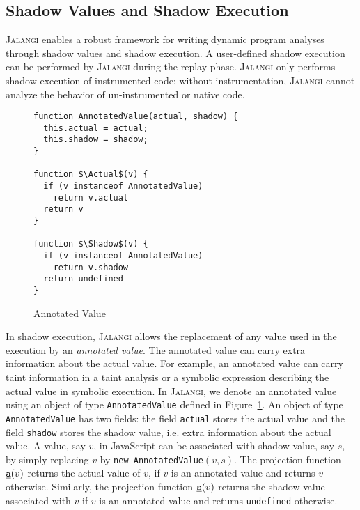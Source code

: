 \documentclass{sig-alternate}
\def\jalangi{\textsc{Jalangi}}
\newcommand \usl [1] {\mbox{\underline{\tt #1}}\xspace}
\newcommand \Actual{\usl{a}}
\newcommand \Shadow{\usl{s}}
\begin{document}
\subsection{Shadow Values and Shadow Execution}
\label{sec:shadow-values-shadow}

\jalangi{} enables a robust framework for writing dynamic program analyses
through shadow values and shadow execution.  A user-defined shadow
execution can be performed by \jalangi{} during the replay phase.
\jalangi{} only performs shadow execution of instrumented code:
without instrumentation, \jalangi{} cannot analyze the behavior of
un-instrumented or native code.

\lstset{language=JavaScript}
\begin{figure}
  
{\small 
\begin{lstlisting}[mathescape]
function AnnotatedValue(actual, shadow) {
  this.actual = actual;
  this.shadow = shadow;
}

function $\Actual$(v) {
  if (v instanceof AnnotatedValue)
    return v.actual
  return v
}

function $\Shadow$(v) {
  if (v instanceof AnnotatedValue)
    return v.shadow
  return undefined
}
\end{lstlisting}
}
  \caption{Annotated Value}
  \label{fig:annot}
\end{figure}

In shadow execution, \jalangi{} allows the replacement of any value
used in the execution by an \emph{annotated value}.  The annotated
value can carry extra information about the actual value.  For
example, an annotated value can carry taint information in a taint
analysis or a symbolic expression describing the actual value in
symbolic execution.  In \jalangi{}, we denote an annotated value using
an object of type \texttt{AnnotatedValue} defined in
Figure~\ref{fig:annot}.  An object of type \texttt{AnnotatedValue} has
two fields: the field \texttt{actual} stores the actual value and the
field \texttt{shadow} stores the shadow value, i.e. extra information
about the actual value.  A value, say $v$, in JavaScript can be
associated with shadow value, say $s$, by simply replacing $v$ by
\texttt{new AnnotatedValue}$(v, s)$.  The projection function
$\Actual(v)$ returns the actual value of $v$, if $v$ is an annotated
value and returns $v$ otherwise.  Similarly, the projection function
$\Shadow(v)$ returns the shadow value associated with $v$ if $v$ is an
annotated value and returns \texttt{undefined} otherwise.
\end{document}
